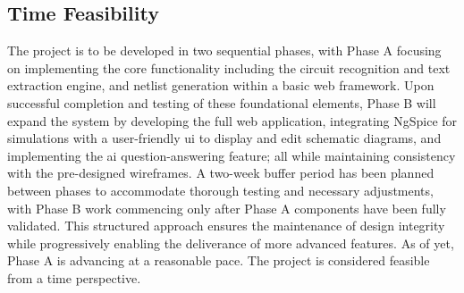 \subsection{Time Feasibility}

The project is to be developed in two sequential phases, with Phase A focusing on implementing the core functionality including the circuit recognition and text extraction engine, and netlist generation within a basic web framework. Upon successful completion and testing of these foundational elements, Phase B will expand the system by developing the full web application, integrating NgSpice for simulations with a user-friendly \gls{ui} to display and edit schematic diagrams, and implementing the \gls{ai} question-answering feature; all while maintaining consistency with the pre-designed wireframes. A two-week buffer period has been planned between phases to accommodate thorough testing and necessary adjustments, with Phase B work commencing only after Phase A components have been fully validated. This structured approach ensures the maintenance of design integrity while progressively enabling the deliverance of more advanced features. As of yet, Phase A is advancing at a reasonable pace. The project is considered feasible from a time perspective.
